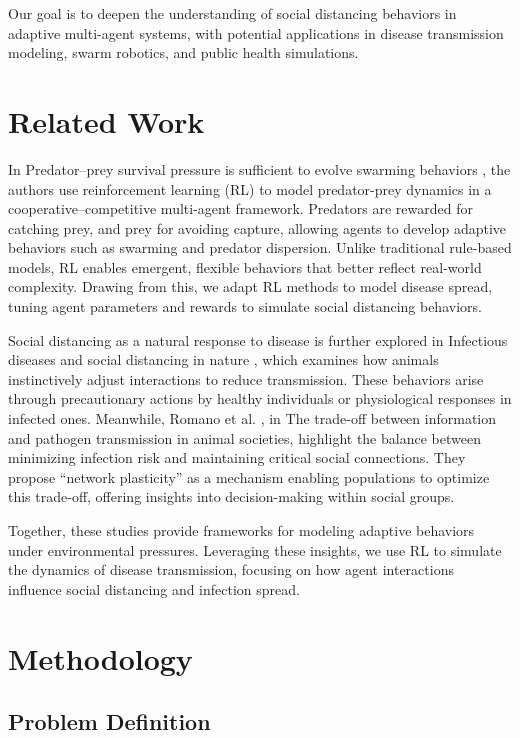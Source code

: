 \documentclass[9pt]{IEEEtran}
\begin{document}
Our goal is to deepen the understanding of social distancing behaviors in adaptive multi-agent systems, with potential applications in disease transmission modeling, swarm robotics, and public health simulations.

\section{Related Work}

In Predator–prey survival pressure is sufficient to evolve swarming behaviors \cite{li2023predator}, the authors use reinforcement learning (RL) to model predator-prey dynamics in a cooperative–competitive multi-agent framework. Predators are rewarded for catching prey, and prey for avoiding capture, allowing agents to develop adaptive behaviors such as swarming and predator dispersion. Unlike traditional rule-based models, RL enables emergent, flexible behaviors that better reflect real-world complexity. Drawing from this, we adapt RL methods to model disease spread, tuning agent parameters and rewards to simulate social distancing behaviors.

Social distancing as a natural response to disease is further explored in Infectious diseases and social distancing in nature \cite{stockmaier2021infectious}, which examines how animals instinctively adjust interactions to reduce transmission. These behaviors arise through precautionary actions by healthy individuals or physiological responses in infected ones. Meanwhile, Romano et al. \cite{romano2022tradeoff}, in The trade-off between information and pathogen transmission in animal societies, highlight the balance between minimizing infection risk and maintaining critical social connections. They propose “network plasticity” as a mechanism enabling populations to optimize this trade-off, offering insights into decision-making within social groups.

Together, these studies provide frameworks for modeling adaptive behaviors under environmental pressures. Leveraging these insights, we use RL to simulate the dynamics of disease transmission, focusing on how agent interactions influence social distancing and infection spread.

\section{Methodology}

\subsection{Problem Definition}
\end{document}
